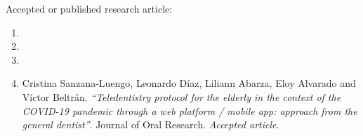 \documentclass[10pt,a4paper]{article}
\begin{document}








\headedsubsection 
{Accepted or published research article:}{}
{
\begin{enumerate}
\item {}

\item {}

\item {}

\item Cristina Sanzana-Luengo, Leonardo Díaz, Liliann Abarza, Eloy Alvarado and Víctor Beltrán. \textit{``Teledentistry protocol for the elderly in the context of the COVID-19 pandemic through a web platform / mobile app: approach from the general dentist''}. Journal of Oral Research. \textit{Accepted article}.
\end{enumerate}
}


\end{document}
